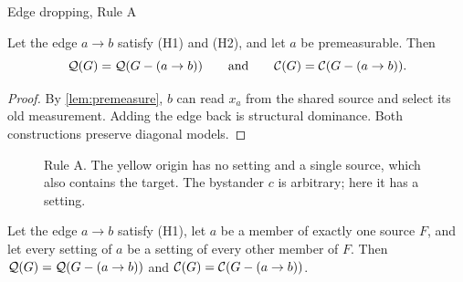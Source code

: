 \begin{rulebox}{Edge dropping, Rule A}
\begin{theorem}\label{thm:ruleA}
Let the edge $a\to b$ satisfy (H1) and (H2), and let $a$ be premeasurable. Then
\[\mathcal{Q}(G)=\mathcal{Q}(G-(a\to b))\qquad\text{and}\qquad\mathcal{C}(G)=\mathcal{C}(G-(a\to b)).\]
\end{theorem}
\end{rulebox}

\begin{proof}
By \cref{lem:premeasure}, $b$ can read $x_a$ from the shared source and select its old measurement.
Adding the edge back is structural dominance. Both constructions preserve diagonal models.
\end{proof}

\begin{figure}[H]
\centering
{}
\caption{Rule A. The yellow origin has no setting and a single source, which also contains the target. The
bystander $c$ is arbitrary; here it has a setting.}
\label{fig:ruleA}
\end{figure}

\begin{proposition}\label{prop:ruleA-settings}
Let the edge $a\to b$ satisfy (H1), let $a$ be a member of exactly one source $F$, and let every setting of $a$ be
a setting of every other member of $F$. Then $\mathcal{Q}(G)=\mathcal{Q}(G-(a\to b))$ and $\mathcal{C}(G)=\mathcal{C}(G-(a\to b))$.
\end{proposition}

